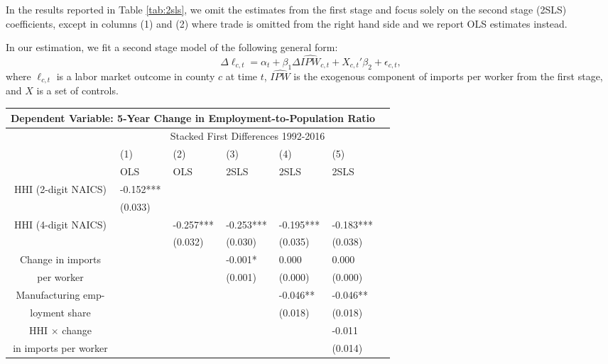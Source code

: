 \documentclass[onehalfspacing,11pt]{article}
\begin{document}
In the results reported in Table \ref{tab:2sls}, we omit the estimates from the first stage and focus solely on the second stage (2SLS) coefficients, except in columns (1) and (2) where trade is omitted from the right hand side and we report OLS estimates instead.

In our estimation, we fit a second stage model of the following general form:
\begin{equation}
\label{eq:2sls}
\Delta \ell_{c,t} = \alpha_t + \beta_1 \Delta \widehat{IPW}_{c,t} + X_{c,t}' \beta_2 + \epsilon_{c,t},
\end{equation}
where $\ell_{c,t}$ is a labor market outcome in county $c$ at time $t$, $\widehat{IPW}$ is the exogenous component of imports per worker from the first stage, and $X$ is a set of controls.
\begin{table}
  \centering 
    \begin{tabularx}{\textwidth}{ c *{6}{X} }
    \toprule
    \multicolumn{6}{c}{Dependent Variable: 5-Year Change in Employment-to-Population Ratio} \\
    \midrule
    & \multicolumn{5}{c}{Stacked First Differences 1992-2016}\\
    & (1) & (2) & (3) & (4) & (5) \\
    & OLS & OLS & 2SLS & 2SLS & 2SLS \\
    \midrule
HHI (2-digit NAICS) & -0.152*** \\
                                & (0.033) \\
\midrule
HHI (4-digit NAICS)& & -0.257*** & -0.253*** & -0.195*** & -0.183***\\
			      & & (0.032) & (0.030) & (0.035) & (0.038)\\
\midrule
Change in imports &  &  & -0.001* & 0.000 & 0.000 \\
per worker	     &  &  & (0.001) & (0.000) & (0.000) \\
\midrule
Manufacturing emp- & & & & -0.046** & -0.046**\\
loyment share & & & & (0.018) & (0.018) \\
\midrule
HHI $\times$ change & & & & &  -0.011\\
 in imports per worker & & & & &  (0.014)\\

\end{tabularx}
\end{table}
\end{document}
